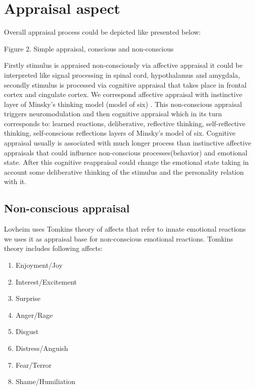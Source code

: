 \section{Appraisal aspect}

Overall appraisal process could be depicted like presented below:

\begin{center}
Figure 2. Simple appraisal, conscious and non-conscious
\end{center}

Firstly stimulus is appraised non-consciously via affective appraisal it could be interpreted like signal processing in spinal cord, hypothalamus and amygdala, secondly stimulus is processed via cognitive appraisal that takes place in frontal cortex and cingulate cortex. We correspond affective appraisal with instinctive layer of Minsky's thinking model (model of six) \cite{emotionmachine}. This non-conscious appraisal triggers neuromodulation \cite{cubeofemotions} and then cognitive appraisal which in its turn corresponds to: learned reactions, deliberative, reflective thinking, self-reflective thinking, self-conscious reflections layers of Minsky's model of six. Cognitive appraisal usually is associated with much longer process than instinctive affective appraisals that could influence non-conscious processes(behavior) and emotional state. After this cognitive reappraisal could change the emotional state taking in account some deliberative thinking of the stimulus and the personality relation with it.

\subsection{Non-conscious appraisal}

Lovheim uses Tomkins theory of affects that refer to innate emotional reactions we uses it as appraisal base for non-conscious emotional reactions. Tomkins theory \cite{tomkins1, tomkins2, tomkins3, quest} includes following affects:

\begin{enumerate}
 \item  Enjoyment/Joy
 \item  Interest/Excitement
 \item  Surprise
 \item  Anger/Rage
 \item  Disgust
 \item  Distress/Anguish
 \item  Fear/Terror
 \item  Shame/Humiliation
\end{enumerate}

